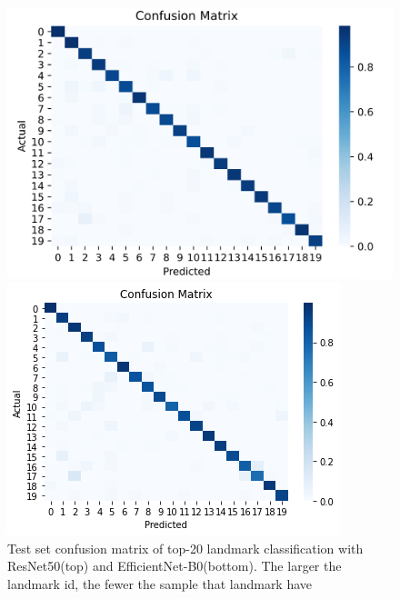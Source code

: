 \documentclass[10pt,twocolumn,letterpaper]{article}
\begin{document}
\begin{figure}
    \centering
    \begin{minipage}[t]{0.4\textwidth}
        \includegraphics[width=\textwidth]{img/top20_test_resnet.png}
    \end{minipage}
    \begin{minipage}[t]{0.4\textwidth}
        \includegraphics[width=\textwidth]{img/top20_test_efficientnet.png}
    \end{minipage}
    \caption{Test set confusion matrix of top-20 landmark classification with ResNet50(top) and EfficientNet-B0(bottom). The larger the landmark id, the fewer the sample that landmark have}
    \label{fig:cm_top20}
\end{figure}

{\small


}
\end{document}
